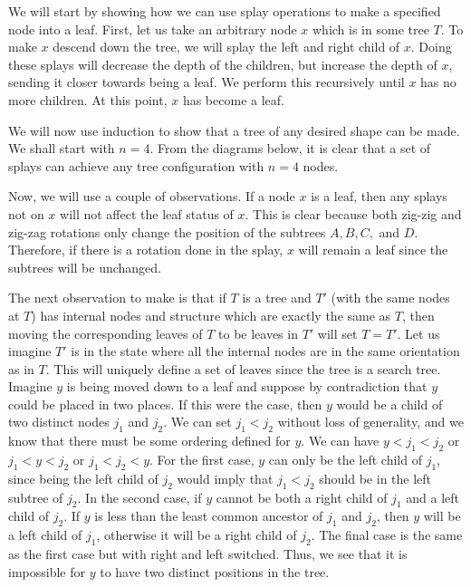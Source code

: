 \documentclass[psamsfonts]{amsart}
\newenvironment{sol}{\vspace{0.25cm}{\large \bfseries Solution:}}{\qedsymbol}
\begin{document}
\begin{sol}
We will start by showing how we can use splay operations to make a specified node into a leaf. First, let us take an arbitrary node $x$ which is in some tree $T$. To make $x$ descend down the tree, we will splay the left and right child of $x$. Doing these splays will decrease the depth of the children, but increase the depth of $x$, sending it closer towards being a leaf. We perform this recursively until $x$ has no more children. At this point, $x$ has become a leaf. 

We will now use induction to show that a tree of any desired shape can be made. We shall start with $n=4$. From the diagrams below, it is clear that a set of splays can achieve any tree configuration with $n=4$ nodes.

Now, we will use a couple of observations. If a node $x$ is a leaf, then any splays not on $x$ will not affect the leaf status of $x$. This is clear because both zig-zig and zig-zag rotations only change the position of the subtrees $A, B, C,$ and $D$. Therefore, if there is a rotation done in the splay, $x$ will remain a leaf since the subtrees will be unchanged. 

The next observation to make is that if $T$ is a tree and $T'$ (with the same nodes at $T$) has internal nodes and structure which are exactly the same as $T$, then moving the corresponding leaves of $T$ to be leaves in $T'$ will set $T = T'$. Let us imagine $T'$ is in the state where all the internal nodes are in the same orientation as in $T$. This will uniquely define a set of leaves since the tree is a search tree. Imagine $y$ is being moved down to a leaf and suppose by contradiction that $y$ could be placed in two places. If this were the case, then $y$ would be a child of two distinct nodes $j_1$ and $j_2$. We can set $j_1 < j_2$ without loss of generality, and we know that there must be some ordering defined for $y$. We can have $y < j_1 < j_2$ or $j_1 < y < j_2$ or $j_1 < j_2 < y$. For the first case, $y$ can only be the left child of $j_1$, since being the left child of $j_2$ would imply that $j_1 < j_2$ should be in the left subtree of $j_2$. In the second case, if $y$ cannot be both a right child of $j_1$ and a left child of $j_2$. If $y$ is less than the least common ancestor of $j_1$ and $j_2$, then $y$ will be a left child of $j_1$, otherwise it will be a right child of $j_2$. The final case is the same as the first case but with right and left switched. Thus, we see that it is impossible for $y$ to have two distinct positions in the tree. 


\end{sol}
\end{document}

